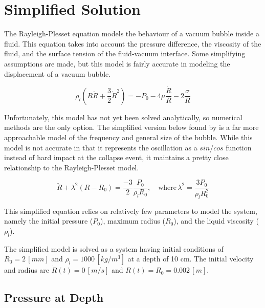 \documentclass[12pt]{article}
\begin{document}
\section{Simplified Solution}

The Rayleigh-Plesset equation \cite{rayleigh-eqn} models the behaviour of a vacuum bubble inside a fluid. This equation takes into account the pressure difference, the viscosity of the fluid, and the surface tension of the fluid-vacuum interface. Some simplifying assumptions are made, but this model is fairly accurate in modeling the displacement of a vacuum bubble.

\begin{equation}
    \label{eqn:part_1_rayleigh}
    \rho_l \left(R \dot R + \frac{3}{2}\dot R^2\right) = -P_0 -4 \mu \frac{\dot R}{R} - 2 \frac{\sigma}{R}
\end{equation}

Unfortunately, this model has not yet been solved analytically, so numerical methods are the only option. The simplified version below found by \cite{simplified_rayleigh} is a far more approachable model of the frequency and general size of the bubble. While this model is not accurate in that it represents the oscillation as a $sin$/$cos$ function instead of hard impact at the collapse event, it maintains a pretty close relationship to the Rayleigh-Plesset model.

\begin{equation}
    \label{eqn:part_1_simplified_eqn}
    \ddot R + \lambda^2 \left(R - R_0\right) = \frac{-3}{2} \frac{P_0}{\rho_l R_0}, \quad \text{where} \, \lambda^2 = \frac{3 P_0}{\rho_l R_0^2}
\end{equation}

\noindent This simplified equation relies on relatively few parameters to model the system, namely the initial pressure ($P_0$),  maximum radius ($R_0$), and the liquid viscosity ($\rho_l$).

The simplified model is solved as a system having initial conditions of $R_0 = 2 \, [mm]$ and $\rho_l = 1000 \, [kg/m^3]$ at a depth of 10 cm. The initial velocity and radius are $\dot R(t) = 0 \, [m/s]$ and $R(t) = R_0 = 0.002 \, [m]$.

\subsection{Pressure at Depth}
\end{document}
